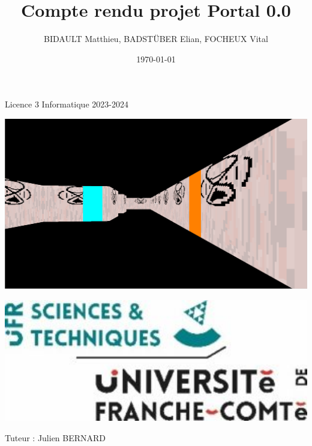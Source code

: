 \documentclass[11pt]{article}
\title{Compte rendu projet Portal 0.0}
\author{BIDAULT Matthieu, BADSTÜBER Elian, FOCHEUX Vital}
\date{\today}
\begin{document}
\begin{titlepage}
	\maketitle
	\centering
	\small Licence 3 Informatique 2023-2024

	\vspace{1cm}

	\centering
	\includegraphics[width=1\textwidth]{image/Portal0.0.png}

	\vfill %

    \begin{minipage}{0.3\textwidth}
        \centering
        \includegraphics[width=1\textwidth]{image/logo-UFR-ST.jpg} 
    \end{minipage}
	\hfill
    \begin{minipage}{0.4\textwidth}
        \begin{flushright}
            \small Tuteur : Julien BERNARD
        \end{flushright}    
    \end{minipage}

\end{titlepage}
\end{document}
